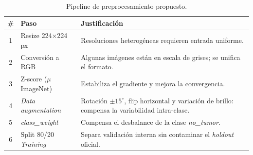 \begin{table}[H]
\centering
\caption{Pipeline de preprocesamiento propuesto.}
\label{tab:pipe}
\begin{tabularx}{\columnwidth}{clX}
\toprule
\textbf{\#} & \textbf{Paso} & \textbf{Justificación} \\
\midrule
1 & Resize 224$\times$224\,px & Resoluciones heterogéneas requieren entrada uniforme. \\
2 & Conversión a RGB & Algunas imágenes están en escala de grises; se unifica el formato. \\
3 & Z-score ($\mu$ ImageNet) & Estabiliza el gradiente y mejora la convergencia. \\
4 & \textit{Data augmentation} & Rotación $\pm 15^{\circ}$, flip horizontal y variación de brillo: compensa la variabilidad intra-clase. \\
5 & \textit{class\_weight} & Compensa el desbalance de la clase \textit{no\_tumor}. \\
6 & Split 80/20 \textit{Training} & Separa validación interna sin contaminar el \textit{holdout} oficial. \\
\bottomrule
\end{tabularx}
\end{table}
